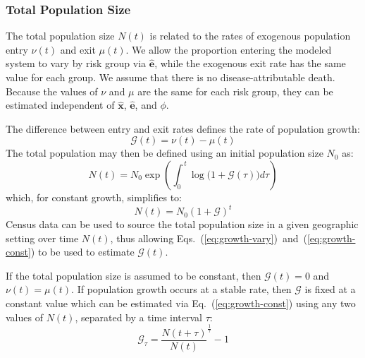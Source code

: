 \subsubsection{Total Population Size}\label{sss:params-nu-mu}
The total population size $N(t)$ is related to
the rates of exogenous population entry $\nu(t)$ and exit $\mu(t)$.  %
We allow the proportion entering the modeled system to vary by risk group via $\bm{\hat{e}}$,
while the exogenous exit rate has the same value for each group. %
We assume that there is no disease-attributable death.
Because the values of $\nu$ and $\mu$ are the same for each risk group, 
they can be estimated independent of
$\bm{\hat{x}}$, $\bm{\hat{e}}$, and $\phi$.
\par
The difference between entry and exit rates
defines the rate of population growth:
\begin{equation}\label{eq:growth-G}
\mathcal{G}(t) = \nu(t) - \mu(t) 
\end{equation}
The total population may then be defined using an initial population size $N_0$ as:
\begin{equation}\label{eq:growth-vary}
  N(t) = N_0 \exp{\left(\int_{0}^{\,t}{\log\big(1+\mathcal{G}(\tau) \big)d\tau}\right)}
\end{equation}
which, for constant growth, simplifies to:   %
\begin{equation} \label{eq:growth-const}
  N(t) = N_0 {(1 + \mathcal{G})}^{t}
\end{equation}
Census data can be used to source the total population size in a given geographic setting over time $N(t)$,  %
thus allowing Eqs.~(\ref{eq:growth-vary})~and~(\ref{eq:growth-const})
to be used to estimate $\mathcal{G}(t)$.
\par
If the total population size is assumed to be constant, then $\mathcal{G}(t) = 0$ and $\nu(t) = \mu(t)$.
If population growth occurs at a stable rate, then 
$\mathcal{G}$ is fixed at a constant value
which can be estimated via Eq.~(\ref{eq:growth-const})
using any two values of $N(t)$, separated by a time interval $\tau$:
\begin{equation}
\mathcal{G}_{\tau} = {\frac{N(t+\tau)}{N(t)}}^{\frac{1}{\tau}} -1
\end{equation}

